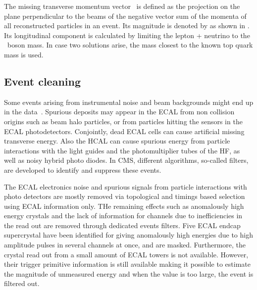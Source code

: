 The missing transverse momentum vector \ptmisvec\ is defined as the projection on the plane perpendicular to the beams of the negative vector sum of the momenta of all reconstructed particles in an event. Its magnitude is denoted by \Etmis as shown in . Its longitudinal component is calculated by limiting the lepton + neutrino to the \PW\ boson mass. In case two solutions arise, the mass closest to the known top quark mass is used. 


\subsection{Event cleaning}
\label{sec:Filters}

Some events arising from instrumental noise and beam backgrounds might end up in the data~\cite{Filters,CMS-PAS-JME-16-004}. Spurious deposits may appear in the ECAL from non collision origins such as beam halo particles, or from particles hitting the sensors in the ECAL photodetectors. Conjointly, dead ECAL cells can cause artificial missing transverse energy. Also the HCAL can cause spurious energy from particle interactions with the light guides and the photomultiplier tubes of the HF, as well as noisy hybrid photo diodes. In CMS, different algorithms, so-called filters, are developed to identify and suppress these events. 


The ECAL electronics noise and spurious signals from particle interactions with photo detectors are mostly removed via topological and timings based selection using  ECAL information only. THe remaining effects such as anomalously high energy crystals and the lack of information for channels due to inefficiencies in the read out are removed through dedicated events filters. Five ECAL endcap supercrystal have been identified for giving anomalously high energies due to high amplitude pulses in several channels at once, and are masked. Furthermore, the crystal read out from a small amount of ECAL towers is not available. However, their trigger primitive information is still available making it possible to estimate the magnitude of unmeasured energy and when the value is too large, the event is filtered out. 

